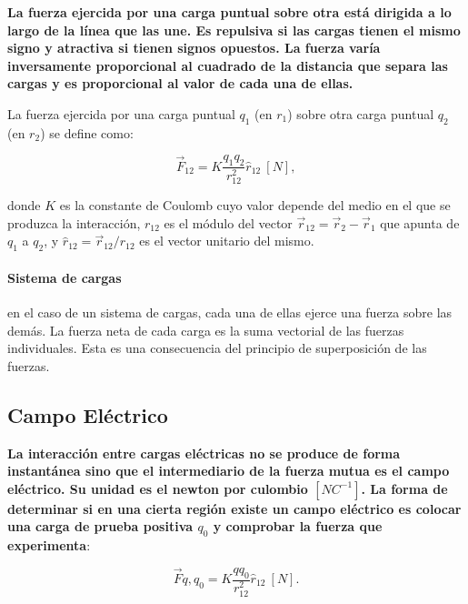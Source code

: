 \documentclass{tufte-handout}
\begin{document}
\textbf{La fuerza ejercida por una carga puntual sobre otra está dirigida a lo largo de la línea que las une. Es repulsiva si las cargas tienen el mismo signo y atractiva si tienen signos opuestos. La fuerza varía inversamente proporcional al cuadrado de la distancia que separa las cargas y es proporcional al valor de cada una de ellas.}

La fuerza ejercida por una carga puntual $q_1$ (en $r_1$) sobre otra carga puntual $q_2$ (en $r_2$) se define como:

\begin{equation}
    \vec{F}_{12} = K\displaystyle\frac{q_1q_2}{r_{12}^2}\hat{r}_{12}~[N],
\end{equation}

donde $K$ es la constante de Coulomb cuyo valor depende del medio en el que se produzca la interacción, $r_{12}$ es el módulo del vector $\vec{r}_{12} = \vec{r}_2 - \vec{r}_1$ que apunta de $q_1$ a $q_2$, y $\hat{r}_{12} = \vec{r}_{12} / r_{12}$ es el vector unitario del mismo.

\paragraph{Sistema de cargas} en el caso de un sistema de cargas, cada una de ellas ejerce una fuerza sobre las demás. La fuerza neta de cada carga es la suma vectorial de las fuerzas individuales. Esta es una consecuencia del principio de superposición de las fuerzas.

\newpage

\subsection{Campo Eléctrico}

\textbf{La interacción entre cargas eléctricas no se produce de forma instantánea sino que el intermediario de la fuerza mutua es el campo eléctrico. Su unidad es el newton por culombio $[NC^{-1}]$. La forma de determinar si en una cierta región existe un campo eléctrico es colocar una carga de prueba positiva $q_0$ y comprobar la fuerza que experimenta}:

\begin{equation}
\vec{F}{q,q_0} = K\frac{q q_0}{r^2_{12}}\hat{r}_{12}~[N].
\end{equation}
\end{document}
